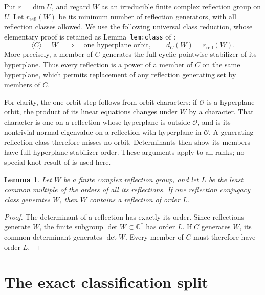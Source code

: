 \documentclass[11pt]{article}
\newtheorem{lemma}[theorem]{Lemma}
\newcommand{\C}{\mathbb C}
\newcommand{\rr}{r_{\mathrm{refl}}}
\begin{document}
Put $r=\dim U$, and regard $W$ as an irreducible finite complex
reflection group on $U$. Let $\rr(W)$ be its minimum number of
reflection generators, with all reflection classes allowed.
We use the following universal class reduction, whose elementary
proof is retained as Lemma~\texttt{lem:class} of \cite{class}:
\begin{equation}\label{eq:class}
 \langle C\rangle=W
 \quad\Longrightarrow\quad
 \text{one hyperplane orbit},\qquad d_C(W)=\rr(W).
\end{equation}
More precisely, a member of $C$ generates the full cyclic pointwise
stabilizer of its hyperplane. Thus every reflection is a power
of a member of $C$ on the same hyperplane, which permits replacement
of any reflection generating set by members of $C$.

For clarity, the one-orbit step follows from orbit characters:
if $\mathcal O$ is a hyperplane orbit, the product of its linear
equations changes under $W$ by a character. That character is one
on a reflection whose hyperplane is outside $\mathcal O$, and is
its nontrivial normal eigenvalue on a reflection with hyperplane
in $\mathcal O$. A generating reflection class therefore misses
no orbit. Determinants then show its members have full
hyperplane-stabilizer order. These arguments apply to all ranks;
no special-knot result of \cite{class} is used here.

\begin{lemma}\label{lem:determinant}
Let $W$ be a finite complex reflection group, and let $L$ be the
least common multiple of the orders of all its reflections.
If one reflection conjugacy class generates $W$, then $W$
contains a reflection of order $L$.
\end{lemma}
\begin{proof}
The determinant of a reflection has exactly its order.
Since reflections generate $W$, the finite subgroup
$\det W\subset\C^*$ has order $L$.
If $C$ generates $W$, its common determinant generates $\det W$.
Every member of $C$ must therefore have order $L$.
\end{proof}

\section{The exact classification split}
\end{document}

